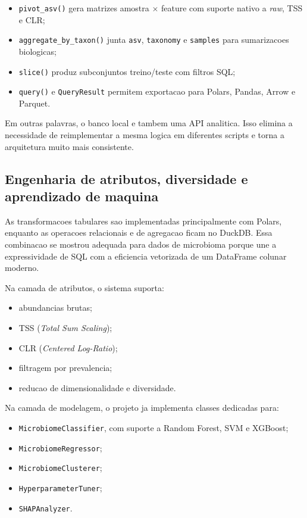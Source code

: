 \documentclass[12pt,a4paper]{article}
\begin{document}
\begin{itemize}[leftmargin=1.5cm]
    \item \texttt{pivot\_asv()} gera matrizes amostra $\times$ feature com suporte nativo a \textit{raw}, TSS e CLR;
    \item \texttt{aggregate\_by\_taxon()} junta \texttt{asv}, \texttt{taxonomy} e \texttt{samples} para sumarizacoes biologicas;
    \item \texttt{slice()} produz subconjuntos treino/teste com filtros SQL;
    \item \texttt{query()} e \texttt{QueryResult} permitem exportacao para Polars, Pandas, Arrow e Parquet.
\end{itemize}

Em outras palavras, o banco local e tambem uma API analitica. Isso elimina a necessidade de reimplementar a mesma logica em diferentes scripts e torna a arquitetura muito mais consistente.

\subsection{Engenharia de atributos, diversidade e aprendizado de maquina}

As transformacoes tabulares sao implementadas principalmente com Polars, enquanto as operacoes relacionais e de agregacao ficam no DuckDB. Essa combinacao se mostrou adequada para dados de microbioma porque une a expressividade de SQL com a eficiencia vetorizada de um DataFrame colunar moderno.

Na camada de atributos, o sistema suporta:

\begin{itemize}[leftmargin=1.5cm]
    \item abundancias brutas;
    \item TSS (\textit{Total Sum Scaling});
    \item CLR (\textit{Centered Log-Ratio});
    \item filtragem por prevalencia;
    \item reducao de dimensionalidade e diversidade.
\end{itemize}

Na camada de modelagem, o projeto ja implementa classes dedicadas para:

\begin{itemize}[leftmargin=1.5cm]
    \item \texttt{MicrobiomeClassifier}, com suporte a Random Forest, SVM e XGBoost;
    \item \texttt{MicrobiomeRegressor};
    \item \texttt{MicrobiomeClusterer};
    \item \texttt{HyperparameterTuner};
    \item \texttt{SHAPAnalyzer}.
\end{itemize}
\end{document}
